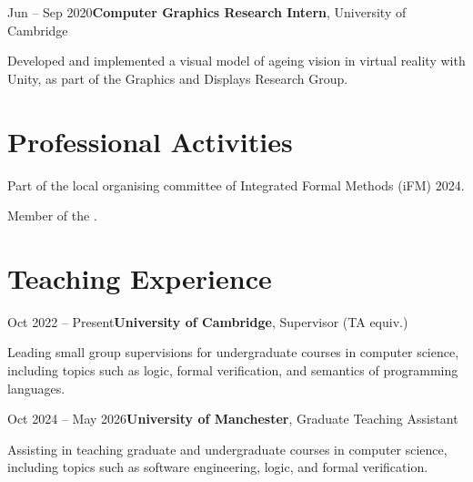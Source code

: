 \documentclass[10pt, letterpaper]{article}
\newcommand{\entryspacing}{0.20 cm}
\begin{document}
    \vspace{\entryspacing}

    \begin{cventry}{Jun -- Sep 2020}{\textbf{Computer Graphics Research Intern}, University of Cambridge}
        \item Developed and implemented a visual model of ageing vision in virtual reality with Unity, as part of the Graphics and Displays Research Group.
    \end{cventry}

\section{Professional Activities}
\begin{onecolentry}
    \begin{highlights}
        \item Part of the local organising committee of Integrated Formal Methods (iFM) 2024.
        \item Member of the .
    \end{highlights}
\end{onecolentry}

\section{Teaching Experience}

    \begin{cventry}{Oct 2022 -- Present}{\textbf{University of Cambridge}, Supervisor (TA equiv.)}
        \item Leading small group supervisions for undergraduate courses in computer science, including topics such as logic, formal verification, and semantics of programming languages.
    \end{cventry}

    \vspace{\entryspacing}

    \begin{cventry}{Oct 2024 -- May 2026}{\textbf{University of Manchester}, Graduate Teaching Assistant}
        \item Assisting in teaching graduate and undergraduate courses in computer science, including topics such as software engineering, logic, and formal verification.
    \end{cventry}

\end{document}
